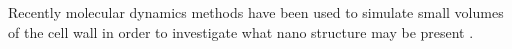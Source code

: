 Recently molecular dynamics methods have been used to simulate small volumes of
the cell wall in order to investigate what nano structure may be present \cite{Charlier_2012}\cite{Zhang_2009}\cite{Sangha_2011}.